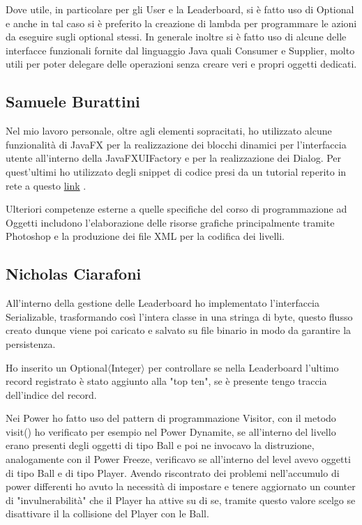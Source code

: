 \documentclass[a4paper,12pt]{report}
\begin{document}
Dove utile, in particolare per gli User e la Leaderboard, si è fatto uso di Optional e anche in tal caso si è preferito la creazione di lambda per programmare le azioni da eseguire sugli optional stessi.
In generale inoltre si è fatto uso di alcune delle interfacce funzionali fornite dal linguaggio Java quali Consumer e Supplier, molto utili per poter delegare delle operazioni senza creare veri e propri oggetti dedicati.

\subsection*{Samuele Burattini}
Nel mio lavoro personale, oltre agli elementi sopracitati, ho utilizzato alcune funzionalità di JavaFX per la realizzazione dei blocchi dinamici per l'interfaccia utente all'interno della JavaFXUIFactory e per la realizzazione dei Dialog. Per quest'ultimi ho utilizzato degli snippet di codice presi da un tutorial reperito in rete a questo \href{http://code.makery.ch/blog/javafx-dialogs-official/} {link} .

Ulteriori competenze esterne a quelle specifiche del corso di programmazione ad Oggetti includono l'elaborazione delle risorse grafiche principalmente tramite Photoshop e la produzione dei file XML per la codifica dei livelli.

\subsection*{Nicholas Ciarafoni}
All'interno della gestione delle Leaderboard ho implementato l'interfaccia Serializable, trasformando così l'intera classe in una stringa di byte, questo flusso creato dunque viene poi caricato e salvato su file binario in modo da garantire la persistenza.

Ho inserito un Optional$\langle$Integer$\rangle$ per controllare se nella Leaderboard l'ultimo record registrato è stato aggiunto alla "top ten", se è presente tengo traccia dell'indice del record.

Nei Power ho fatto uso del pattern di programmazione Visitor, con il metodo visit() ho verificato per esempio nel Power Dynamite, se all'interno del livello erano presenti degli oggetti di tipo Ball e poi ne invocavo la distruzione, analogamente con il Power Freeze, verificavo se all'interno del level avevo oggetti di tipo Ball e di tipo Player.
Avendo riscontrato dei problemi nell'accumulo di power differenti ho avuto la necessità di impostare e tenere aggiornato un counter di "invulnerabilità" che il Player ha attive su di se, tramite questo valore scelgo se disattivare il la collisione del Player con le Ball.
\end{document}
